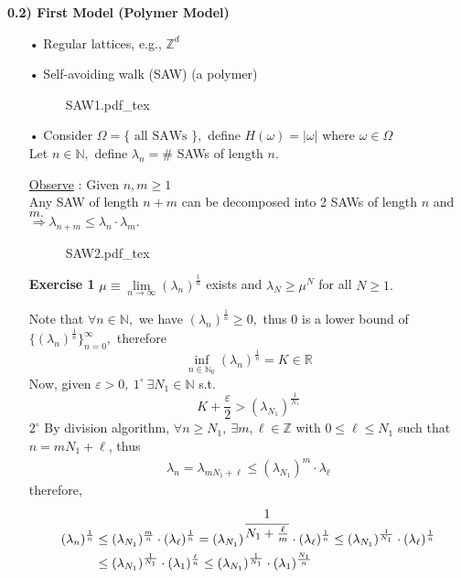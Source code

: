 \documentclass[12pt,a4paper]{article}
\newcommand{\incfig}[1]{%
{#1.pdf_tex}
}
\begin{document}
\begin{flushleft}
	\Large \textbf{0.2) First Model (Polymer Model)}
\end{flushleft}
\begin{enumerate}
	\item[•] Regular lattices, e.g., $\mathbb{Z}^d$
	\item[•] Self-avoiding walk (SAW) (a polymer)
	\begin{figure}[htp]
	\centering
	\def\svgwidth{7cm}
	\incfig{SAW1}
	\end{figure}
	\item[•] Consider $\Omega=\{\mbox{ all SAWs } \},$ define $H(\omega)=|\omega|$ where $\omega\in\Omega$\\
	Let $n\in \mathbb{N},$ define $\lambda_n=\#$ SAWs of length $n.$
	\item[\underline{Observe} : ] Given $n,m\geq 1$\\
	Any SAW of length $n+m$ can be decomposed into 2 SAWs of length $n$ and $m.$\\
	$\Rightarrow \lambda_{n+m}\leq \lambda_n\cdot \lambda_m.$
	\begin{figure}[htp]
	\centering
	\def\svgwidth{7cm}
	\incfig{SAW2}
	\end{figure}
	\item[\textbf{Exercise 1}] $\mu\equiv \lim\limits_{n\to\infty}(\lambda_n)^{\frac{1}{n}}$ exists and $\lambda_N\geq \mu^N$ for all $N\geq 1.$
	\item[\fbox{SOL}] Note that $\forall n\in \mathbb{N},$ we have $(\lambda_n)^{\frac{1}{n}}\geq 0,$ thus $0$ is a lower bound of $\{(\lambda_n)^{\frac{1}{n}}\}_{n=0}^\infty,$ therefore
	\[
	\inf_{n\in\mathbb{N}_0}(\lambda_n)^{\frac{1}{n}}=K\in\mathbb{R}
	\]
	Now, given $\varepsilon>0,\ 1^{\circ}\ \exists N_1\in\mathbb{N}$ s.t.
	\[
	K+\frac{\varepsilon}{2}>(\lambda_{N_1})^\frac{1}{N_1}
	\]
	$2^{\circ}$ By division algorithm, $\forall n\geq N_1,\ \exists m,\ell \in \mathbb{Z}$ with $0\leq \ell\leq N_1$ such that $n=mN_1+\ell$, thus
	\begin{align*}
	\lambda_n=\lambda_{mN_1+\ell}\leq (\lambda_{N_1})^m\cdot \lambda_\ell
	\end{align*}
	therefore,
	\begin{align*}
	(\lambda_n)^{\frac{1}{n}}&\leq (\lambda_{N_1})^{\frac{m}{n}}\cdot (\lambda_\ell)^{\frac{1}{n}}=(\lambda_{N_1})^{\cfrac{1}{N_1+\frac{\ell}{m}}}\cdot (\lambda_\ell)^\frac{1}{n}\leq (\lambda_{N_1})^\frac{1}{N_1}\cdot (\lambda_\ell)^\frac{1}{n}\\
	&\leq (\lambda_{N_1})^\frac{1}{N_1}\cdot (\lambda_1)^\frac{\ell}{n}\leq (\lambda_{N_1})^\frac{1}{N_1}\cdot (\lambda_1)^\frac{N_1}{n}

\end{align*}
\end{enumerate}
\end{document}
